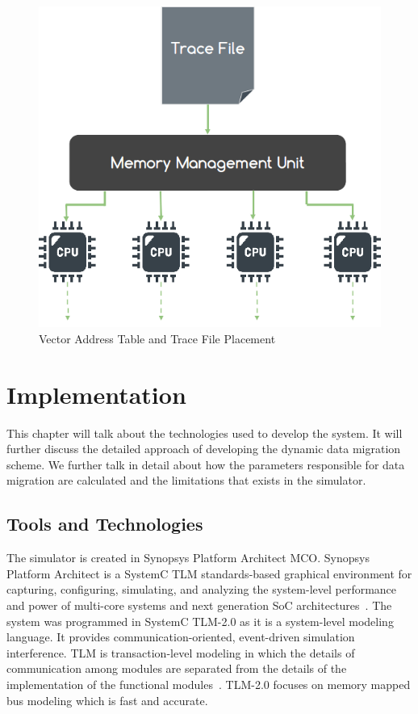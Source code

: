 \documentclass{listhesis}
\begin{document}
\begin{figure}[h!]
  \includegraphics[width=0.7\linewidth]{traceFile.png}
  \centering
  \caption{Vector Address Table and Trace File Placement}
  \label{fig:traceFile}
\end{figure}
\chapter{Implementation}
This chapter will talk about the technologies used to develop the system. It will further discuss the detailed approach of developing the dynamic data migration scheme. We further talk in detail about how the parameters responsible for data migration are calculated and the limitations that exists in the simulator. \\
\section{Tools and Technologies}
The simulator is created in Synopsys Platform Architect MCO. Synopsys Platform Architect is a SystemC TLM standards-based graphical environment for capturing, configuring, simulating, and analyzing the system-level performance and power of multi-core systems and next generation SoC architectures~\cite{synopsys}.
The system was programmed in SystemC TLM-2.0 as it is a system-level modeling language. It provides communication-oriented, event-driven simulation interference. TLM is transaction-level modeling in which the details of communication among modules are separated from the details of the implementation of the functional modules~\cite{tlm}. TLM-2.0 focuses on memory mapped bus modeling which is fast and accurate.\\
\end{document}
